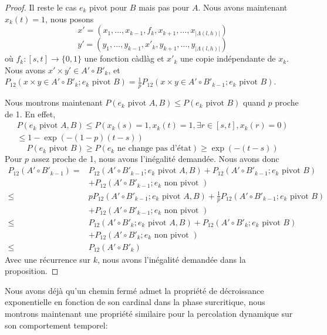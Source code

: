 \documentclass[titlepage,a4paper,12pt]{article}
\newcounter{prop}
\begin{document}
\begin{proof}
Il reste le cas $e_k$ pivot pour $B$ mais pas pour $A$. Nous avons maintenant $x_k(t) = 1$, nous posons 
$$ x'=(x_1,\dots,x_{k-1},f_k,x_{k+1},\dots,x_{|\Lambda(l,h)|})
$$
$$y' =(y_1,\dots,y_{k-1},x'_k,y_{k+1},\dots,y_{|\Lambda(l,h)|})
$$
où $f_k:[s,t]\rightarrow\{0,1\}$ une fonction càdlàg et $x'_k$ une copie indépendante de $x_k$. Nous avons $x'\times y' \in A'\circ B'_k$, et $P_{12}(x\times y \in A'\circ B'_k; e_k \text{ pivot }B) = \frac{1}{p}P_{12}(x\times y \in A'\circ B'_{k-1}; e_k \text{ pivot }B)$.

Nous montrons maintenant $P(e_k \text{ pivot } A,B) \leqslant P(e_k \text{ pivot } B)$ quand $p$ proche de 1. En effet, 
\begin{multline*}
P(e_k \text{ pivot } A,B)\leqslant P(x_k(s) = 1, x_k(t) =1, \exists r\in [s,t], x_k(r) = 0)\\
 \leqslant 1- \exp(-(1-p)(t-s))
\end{multline*}
$$P(e_k \text{ pivot }B) \geqslant P(e_k \text{ ne change pas d'état}) \geqslant \exp(-(t-s))
$$
Pour $p$ assez proche de 1, nous avons l'inégalité demandée. Nous avons donc
\begin{align*}
P_{12}(A'\circ B'_{k-1}) =& P_{12}(A'\circ B'_{k-1};e_k \text{ pivot } A,B) + P_{12}(A'\circ B'_{k-1};e_k \text{ pivot } B) \\
  &+ P_{12}(A'\circ B'_{k-1};e_k \text{ non pivot })\\
\leqslant &  p P_{12}(A'\circ B'_{k-1};e_k \text{ pivot } A,B) + \frac{1}{p}P_{12}(A'\circ B'_{k-1};e_k \text{ pivot } B) \\
  &+ P_{12}(A'\circ B'_{k-1};e_k \text{ non pivot })\\
\leqslant & P_{12}(A'\circ B'_{k};e_k \text{ pivot } A,B) + P_{12}(A'\circ B'_{k};e_k \text{ pivot } B) \\
  &+ P_{12}(A'\circ B'_{k};e_k \text{ non pivot })\\
  \leqslant & P_{12}(A'\circ B'_{k})
\end{align*}
Avec une récurrence sur $k$, nous avons l'inégalité demandée dans la proposition.
\end{proof}

Nous avons déjà qu'un chemin fermé admet la propriété de décroissance exponentielle en fonction de son cardinal dans la phase surcritique, nous montrons maintenant une propriété similaire pour la percolation dynamique sur son comportement temporel: 
\end{document}
